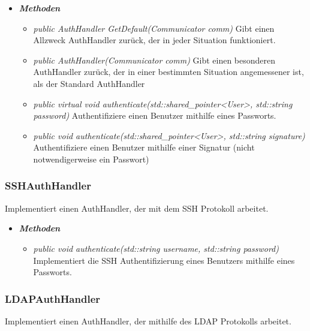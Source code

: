 \documentclass[a4paper,12pt]{article}
\begin{document}
	\begin{itemize}[label={}]

	\item\textit{\textbf{Methoden}}
		\begin{itemize}[label={\textbullet}]
			\item\textit{public AuthHandler GetDefault(Communicator comm)} Gibt einen Allzweck AuthHandler zurück, der in jeder Situation funktioniert.
			\item\textit{public AuthHandler(Communicator comm)} Gibt einen besonderen AuthHandler zurück, der in einer bestimmten Situation angemessener ist, als der Standard AuthHandler
			\item\textit{public virtual void authenticate(std::shared\_pointer<User>, std::string password)} Authentifiziere einen Benutzer mithilfe eines Passworts.
			\item\textit{public void authenticate(std::shared\_pointer<User>, std::string signature)} Authentifiziere einen Benutzer mithilfe einer Signatur (nicht notwendigerweise ein Passwort)
			
		\end{itemize}

\end{itemize}


\subsubsection{SSHAuthHandler}

Implementiert einen AuthHandler, der mit dem SSH Protokoll arbeitet.

	\begin{itemize}[label={}]

	\item\textit{\textbf{Methoden}}
		\begin{itemize}[label={\textbullet}]
			\item\textit{public void authenticate(std::string username, std::string password)} Implementiert die SSH Authentifizierung eines Benutzers mithilfe eines Passworts.
		\end{itemize}

\end{itemize}


\subsubsection{LDAPAuthHandler}

Implementiert einen AuthHandler, der mithilfe des LDAP Protokolls arbeitet.
\end{document}
